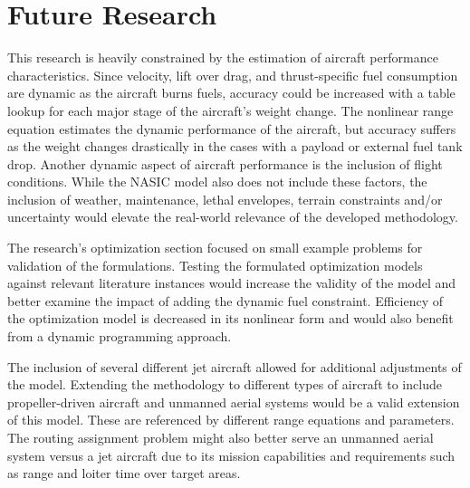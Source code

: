 \section{Future Research}
This research is heavily constrained by the estimation of aircraft performance characteristics. Since velocity, lift over drag, and thrust-specific fuel consumption are dynamic as the aircraft burns fuels, accuracy could be increased with a table lookup for each major stage of the aircraft's weight change. The nonlinear range equation estimates the dynamic performance of the aircraft, but accuracy suffers as the weight changes drastically in the cases with a payload or external fuel tank drop. Another dynamic aspect of aircraft performance is the inclusion of flight conditions. While the NASIC model also does not include these factors, the inclusion of weather, maintenance, lethal envelopes, terrain constraints and/or uncertainty would elevate the real-world relevance of the developed methodology. \par
The research's optimization section focused on small example problems for validation of the formulations. Testing the formulated optimization models against relevant literature instances would increase the validity of the model and better examine the impact of adding the dynamic fuel constraint. Efficiency of the optimization model is decreased in its nonlinear form and would also benefit from a dynamic programming approach. \par
The inclusion of several different jet aircraft allowed for additional adjustments of the model. Extending the methodology to different types of aircraft to include propeller-driven aircraft and unmanned aerial systems would be a valid extension of this model. These are referenced by different range equations and parameters. The routing assignment problem might also better serve an unmanned aerial system versus a jet aircraft due to its mission capabilities and requirements such as range and loiter time over target areas.